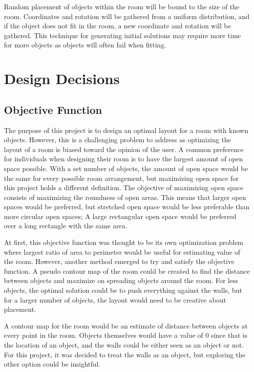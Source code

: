 \documentclass[conference]{IEEEtran}
\begin{document}
    Random placement of objects within the room will be bound to the size of the room. Coordinates and rotation will be gathered from a uniform distribution, and if the object does not fit in the room, a new coordinate and rotation will be gathered. This technique for generating initial solutions may require more time for more objects as objects will often fail when fitting.
    

\section{Design Decisions}
    \subsection{Objective Function}
    The purpose of this project is to design an optimal layout for a room with known objects. However, this is a challenging problem to address as optimizing the layout of a room is biased toward the opinion of the user. A common preference for individuals when designing their room is to have the largest amount of open space possible. With a set number of objects, the amount of open space would be the same for every possible room arrangement, but maximizing open space for this project holds a different definition. The objective of maximizing open space consists of maximizing the roundness of open areas. This means that larger open spaces would be preferred, but stretched open space would be less preferable than more circular open spaces; A large rectangular open space would be preferred over a long rectangle with the same area.
    
    At first, this objective function was thought to be its own optimization problem where largest ratio of area to perimeter would be useful for estimating value of the room. However, another method emerged to try and satisfy the objective function. A pseudo contour map of the room could be created to find the distance between objects and maximize on spreading objects around the room. For less objects, the optimal solution could be to push everything against the walls, but for a larger number of objects, the layout would need to be creative about placement.
    
    A contour map for the room would be an estimate of distance between objects at every point in the room. Objects themselves would have a value of 0 since that is the location of an object, and the walls could be either seen as an object or not. For this project, it was decided to treat the walls as an object, but exploring the other option could be insightful.
    
\end{document}
